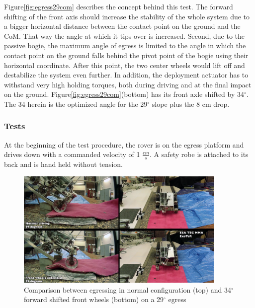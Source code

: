 \documentclass[a4paper,twocolumn]{esapub2005} %
\begin{document}
Figure\ref{fig:egress29com} describes the concept behind this test. The forward shifting of the front axis should increase the stability of the whole system due to a bigger horizontal distance between the contact point on the ground and the CoM. That way the angle at which it tips over is increased. Second, due to the passive bogie, the maximum angle of egress is limited to the angle in which the contact point on the ground falls behind the pivot point of the bogie using their horizontal coordinate. After this point, the two center wheels would lift off and destabilize the system even further. In addition, the deployment actuator has to withstand very high holding torques, both during driving and at the final impact on the ground.
Figure\ref{fig:egress29com}(bottom) has its front axle shifted by 34$^\circ$. The 34 herein is the optimized angle for the 29$^\circ$ slope plus the 8 cm drop. 



\subsubsection{Tests}

At the beginning of the test procedure, the rover is on the egress platform and drives down with a commanded velocity of 1 $\frac{cm}{s}$. A safety robe is attached to its back and is hand held without tension. 

\begin{figure}[h!]
	\centering		\includegraphics[width=0.9\textwidth]{egress29.png}	
	\caption{Comparison between egressing in normal configuration (top) and 34$^{\circ}$ forward shifted front wheels (bottom) on a 29$^{\circ}$ egress}
	\label{fig:egress29}
\end{figure}
\end{document}
